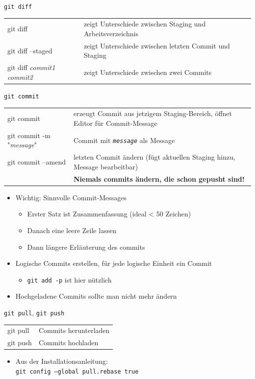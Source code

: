 \begin{frame}{\texttt{git diff}}
  \begin{tabu}{>{\ttfamily}l X[,L]}
    git diff                                   & zeigt Unterschiede zwischen Staging und Arbeitsverzeichnis \\
    git diff --staged                          & zeigt Unterschiede zwischen letzten Commit und Staging \\
    git diff \textit{commit1} \textit{commit2} & zeigt Unterschiede zwischen zwei Commits
  \end{tabu}
\end{frame}

\begin{frame}{\texttt{git commit}}
  \begin{tabu}{>{\ttfamily}l X[,L]}
    git commit                       & erzeugt Commit aus jetzigem Staging-Bereich, öffnet Editor für Commit-Message \\
    git commit -m "\textit{message}" & Commit mit \texttt{\textit{message}} als Message \\
    git commit --amend               & letzten Commit ändern (fügt aktuellen Staging hinzu, Message bearbeitbar) \\
    & \alert{\bfseries Niemals commits ändern, die schon gepusht sind!}
  \end{tabu}

  \begin{itemize}
    \item Wichtig: Sinnvolle Commit-Messages
      \begin{itemize}
        \item Erster Satz ist Zusammenfassung (ideal < 50 Zeichen)
        \item Danach eine leere Zeile lassen
        \item Dann längere Erläuterung des commits
      \end{itemize}
    \item Logische Commits erstellen, für jede logische Einheit ein Commit
      \begin{itemize}
        \item \texttt{git add -p} ist hier nützlich
      \end{itemize}
    \item Hochgeladene Commits sollte man nicht mehr ändern
  \end{itemize}
\end{frame}

\begin{frame}{\texttt{git pull}, \texttt{git push}}
  \begin{tabu}{>{\ttfamily}l X[,L]}
    git pull          & Commits herunterladen \\
    git push          & Commits hochladen
  \end{tabu}

  \begin{itemize}
    \item Aus der Installationsanleitung: \\
      \texttt{git config --global pull.rebase true}
  \end{itemize}
\end{frame}

